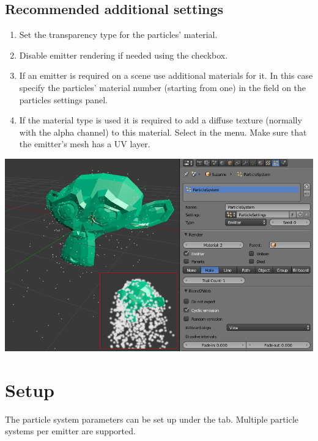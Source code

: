 \documentclass[a4paper,12pt,oneside]{sphinxmanual}
\begin{document}
\subsection{Recommended additional settings}
\label{particles:id4}\begin{enumerate}
\item {} 
Set the  transparency type for the particles' material.

\item {} 
Disable emitter rendering if needed using the  checkbox.

\item {} 
If an emitter is required on a scene use additional materials for it. In this case specify the particles' material number (starting from one) in the  field on the particles settings panel.

\item {} 
If the  material type is used it is required to add a diffuse texture (normally with the alpha channel) to this material. Select   in the  menu.  Make sure that the emitter's mesh has a UV layer.

\end{enumerate}

{\hfill\includegraphics[width=1.000\linewidth]{particles_first_steps.jpg}\hfill}


\section{Setup}
\label{particles:id5}
The particle system parameters can be set up under the  tab. Multiple particle systems per emitter are supported.
\end{document}
